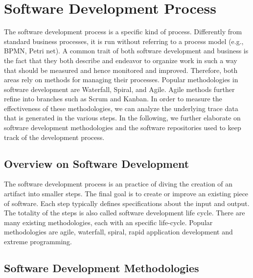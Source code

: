 \section{Software Development Process}
\label{sec:software-development}

The software development process is a specific kind of process. Differently from standard business processes, it is run without referring to a process model (e.g., BPMN, Petri net). A common trait of both software development and business is the fact that they both describe and endeavor to organize work in such a way that should be measured and hence monitored and improved. Therefore, both areas rely on methods for managing their processes. Popular methodologies in software development are Waterfall, Spiral, and Agile. Agile methods further refine into branches such as Scrum and Kanban. In order to measure the effectiveness of these methodologies, we can analyze the underlying trace data that is generated in the various steps. In the following, we further elaborate on software development methodologies and the software repositories used to keep track of the development process. 

\subsection{Overview on Software Development}

The software development process is an practice of diving the creation of an artifact into smaller steps. The final goal is to create or improve an existing piece of software. Each step typically defines specifications about the input and output. The totality of the steps is also called software development life cycle. There are many existing methodologies, each with an specific life-cycle.
Popular methodologies are agile, waterfall, spiral, rapid application development and extreme programming.







\subsection{Software Development Methodologies}





